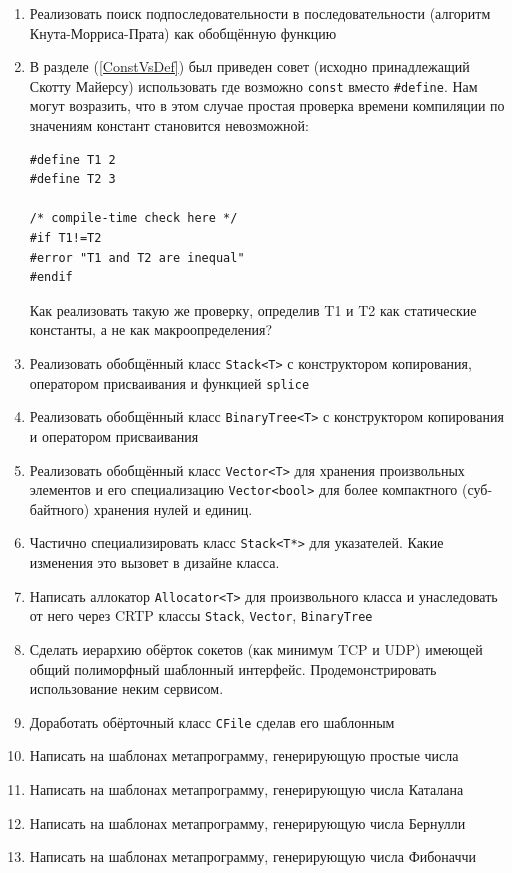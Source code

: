 \documentclass[a4paper,12pt,oneside]{article}
\begin{document}
\begin{enumerate}

\item
Реализовать поиск подпоследовательности в последовательности (алгоритм Кнута-Морриса-Прата) как обобщённую функцию

\item
В разделе (\ref{ConstVsDef}) был приведен совет (исходно принадлежащий Скотту Майерсу) использовать где возможно \lstinline!const! вместо \lstinline!#define!. Нам могут возразить, что в этом случае простая проверка времени компиляции по значениям констант становится невозможной:
\begin{lstlisting}
#define T1 2
#define T2 3

/* compile-time check here */
#if T1!=T2
#error "T1 and T2 are inequal"
#endif
\end{lstlisting}

Как реализовать такую же проверку, определив T1 и T2 как статические константы, а не как макроопределения?

\item
Реализовать обобщённый класс \lstinline!Stack<T>! с конструктором копирования, оператором присваивания и функцией \lstinline!splice!

\item
Реализовать обобщённый класс \lstinline!BinaryTree<T>! с конструктором копирования и оператором присваивания

\item
Реализовать обобщённый класс \lstinline!Vector<T>! для хранения произвольных элементов и его специализацию \lstinline!Vector<bool>! для более компактного (суб-байтного) хранения нулей и единиц.

\item
Частично специализировать класс \lstinline!Stack<T*>! для указателей. Какие изменения это вызовет в дизайне класса.

\item
Написать аллокатор \lstinline!Allocator<T>! для произвольного класса и унаследовать от него через CRTP классы \lstinline!Stack!, \lstinline!Vector!, \lstinline!BinaryTree!

\item
Сделать иерархию обёрток сокетов (как минимум TCP и UDP) имеющей общий полиморфный шаблонный интерфейс. Продемонстрировать использование неким сервисом.

\item
Доработать обёрточный класс \lstinline!CFile! сделав его шаблонным

\item
Написать на шаблонах метапрограмму, генерирующую простые числа

\item
Написать на шаблонах метапрограмму, генерирующую числа Каталана

\item
Написать на шаблонах метапрограмму, генерирующую числа Бернулли 

\item
Написать на шаблонах метапрограмму, генерирующую числа Фибоначчи

\end{enumerate}
\end{document}

